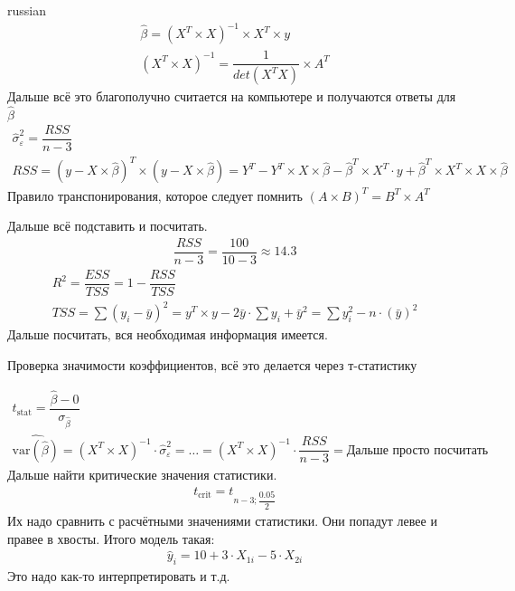 \documentclass{article}
\begin{document}
\begin{otherlanguage*}{russian}
\begin{align*}
\hat \beta = (X^T \times X)^{-1} \times X^T \times y \\
(X^T \times X) ^{-1} = \dfrac{1}{det (X^T X)} \times A^T
\end{align*}
Дальше всё это благополучно считается на компьютере и получаются ответы для $ \hat \beta $ 
\begin{align*}
\hat \sigma^2_{\varepsilon} = \dfrac{RSS}{n-3} \\
RSS = (y - X \times \hat \beta)^T \times (y - X \times \hat \beta ) = Y^T - Y^T \times X \times \hat \beta - \hat \beta^T \times X^T \cdot y + \hat \beta^T \times X^T \times X \times \hat \beta 
\end{align*}
Правило транспонирования, которое следует помнить $ (A \times B)^T = B^T \times A^T  $

Дальше всё подставить и посчитать. 
\begin{align*}
\dfrac{RSS}{n-3} = \dfrac{100}{10-3} \approx 14.3 
\end{align*}
\begin{align*}
R^2 = \dfrac{ESS}{TSS} = 1 - \dfrac{RSS}{TSS} \\
TSS = \sum (y_i - \bar y)^ 2 = y^T \times y - 2 \bar y \cdot \sum y_i + \bar{y}^2 = \sum y_i^2 - n \cdot (\bar y ) ^ 2
\end{align*}
Дальше посчитать, вся необходимая информация имеется. 

Проверка значимости коэффициентов, всё это делается через т-статистику 

\begin{align*}
t_{\text{stat}} = \dfrac{\hat \beta - 0 }{\sigma_{\hat \beta} } \\
\widehat{\text{var} (\hat \beta)} = (X^T \times X)^{-1} \cdot \hat \sigma^2_{\varepsilon} = \ldots	= (X^T \times X ) ^{-1} \cdot \dfrac{RSS}{n-3} = \text{Дальше просто посчитать} 
\end{align*} 
Дальше найти критические значения статистики. 
\begin{align*}
t_{\text{crit}} = t_{n-3; \dfrac{0.05}{2}} 
\end{align*}
Их надо сравнить с расчётными значениями статистики. Они попадут левее и правее в хвосты. Итого модель такая: 
\begin{align*}
\hat y_i = 10 + 3 \cdot X_{1i} - 5 \cdot X_{2i} 
\end{align*}
Это надо как-то интерпретировать и т.д. 

\end{otherlanguage*}
\end{document}
